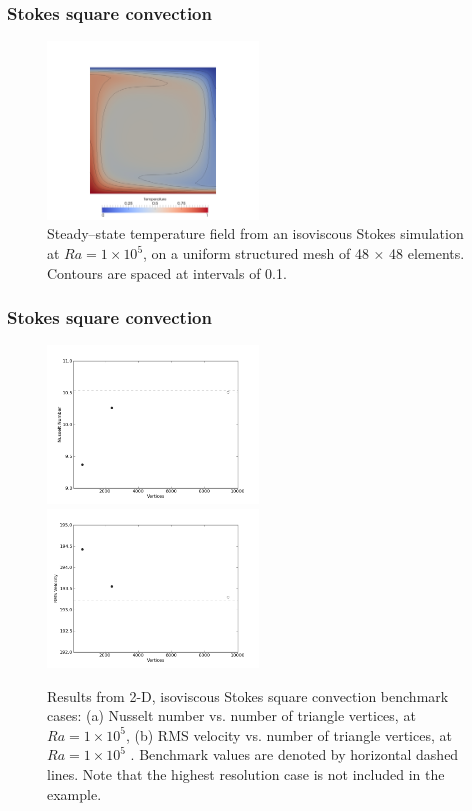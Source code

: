 \begin{frame}
    \frametitle{Stokes square convection}
\begin{figure}
  \includegraphics[width=0.5\textwidth]{./stokes_square_convection/Temperature_planform.png}
  \caption{Steady–state temperature field from an isoviscous Stokes simulation at $Ra = 1 \times
    10^5$, on a uniform structured mesh of 48 × 48 elements. Contours are spaced at intervals of
    0.1.}
\end{figure}
\end{frame}
%
\begin{frame}
    \frametitle{Stokes square convection}
\begin{figure}
\centering
\includegraphics[width=0.5\textwidth]{./stokes_square_convection/Nu_1e5.png}
\includegraphics[width=0.5\textwidth]{./stokes_square_convection/RMS_1e5.png}
\caption{Results from 2-D, isoviscous Stokes square convection benchmark cases: (a) Nusselt number
  vs. number of triangle vertices, at $Ra = 1 \times 10^5$, (b) RMS velocity vs. number of triangle
  vertices, at $Ra = 1 \times 10^5$ . Benchmark values are denoted by horizontal dashed lines. Note that the
  highest resolution case is not included in the example.}
\end{figure}
\end{frame}
